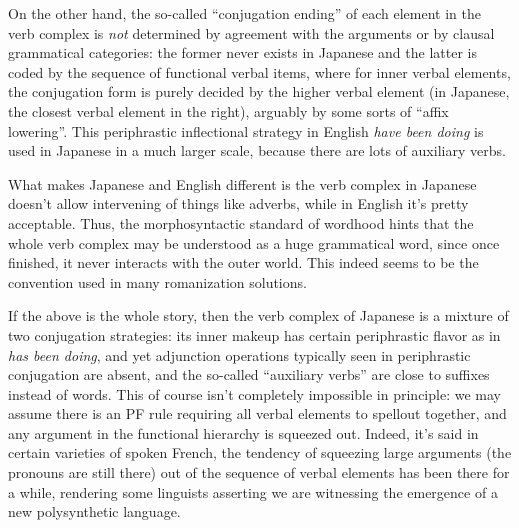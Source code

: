 \documentclass[UTF8, a4paper, oneside, scheme=plain]{ctexart}
\newcommand{\corpus}[1]{\emph{#1}}
\begin{document}
On the other hand, the so-called ``conjugation ending'' of each element in the verb complex 
is \emph{not} determined by agreement with the arguments 
or by clausal grammatical categories:
the former never exists in Japanese and the latter is coded by the sequence of functional verbal items,
where for inner verbal elements,
the conjugation form is purely decided 
by the higher verbal element (in Japanese, the closest verbal element in the right), 
arguably by some sorts of ``affix lowering''.
This periphrastic inflectional strategy in English \corpus{have been doing} 
is used in Japanese in a much larger scale,
because there are lots of auxiliary verbs.

What makes Japanese and English different 
is the verb complex in Japanese doesn't allow intervening of things like adverbs,
while in English it's pretty acceptable.
Thus, the morphosyntactic standard of wordhood hints that 
the whole verb complex may be understood as a huge grammatical word,
since once finished, it never interacts with the outer world.
This indeed seems to be the convention used in many romanization solutions.

If the above is the whole story,
then the verb complex of Japanese is a mixture of two conjugation strategies:
its inner makeup has certain periphrastic flavor as in \corpus{has been doing},
and yet adjunction operations typically seen in periphrastic conjugation are absent, 
and the so-called ``auxiliary verbs'' are close to suffixes instead of words.
This of course isn't completely impossible in principle:
we may assume there is an PF rule requiring all verbal elements to spellout together,
and any argument in the functional hierarchy is squeezed out.
Indeed, it's said in certain varieties of spoken French, 
the tendency of squeezing large arguments (the pronouns are still there) 
out of the sequence of verbal elements 
has been there for a while,
rendering some linguists asserting we are witnessing the emergence of a new polysynthetic language.
\end{document}
